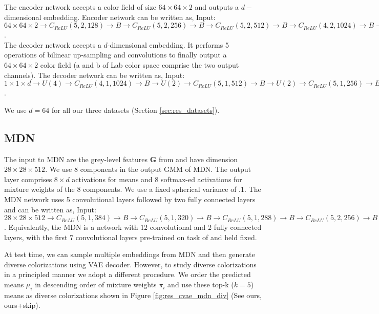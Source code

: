 \documentclass[10pt,twocolumn,letterpaper]{article}
\begin{document}
 The encoder network accepts a color field of size $64 \times 64 \times 2$
and outputs a $d-$dimensional embedding. Encoder network can be written as,  
Input: $64 \times 64 \times 2 \rightarrow C_{ReLU}(5, 2, 128) \rightarrow B \rightarrow C_{ReLU}(5, 2, 256)
\rightarrow B \rightarrow C_{ReLU}(5, 2, 512) \rightarrow B \rightarrow C_{ReLU}(4, 2, 1024) 
\rightarrow B \rightarrow F(d)$. \\

 The decoder network accepts a $d$-dimensional embedding.
It performs 5 operations of bilinear up-sampling and convolutions to finally output a 
$64 \times 64 \times 2$ color field (a and b of Lab color space comprise the two 
output channels). The decoder network can be written as, 
Input: $1 \times 1 \times d \rightarrow U(4) \rightarrow C_{ReLU}(4, 1, 1024) \rightarrow
B \rightarrow U(2) \rightarrow C_{ReLU}(5, 1, 512) \rightarrow B \rightarrow U(2) 
\rightarrow C_{ReLU}(5, 1, 256) \rightarrow B \rightarrow U(2) \rightarrow C_{ReLU}(5, 1, 128) \rightarrow B 
\rightarrow U(2) \rightarrow C_{tanh}(5, 1, 2)$.  


We use $d=64$ for all our three datasets (Section \ref{sec:res_datasets}).

\subsection{MDN}\label{sec:arch_mdn}
The input to MDN are the grey-level features $\mathbf{G}$ from \cite{ZhangColorful}
and have dimension $28 \times 28 \times 512$. We use $8$ components in the output 
GMM of MDN. The output layer comprises $8 \times d$ activations for means and $8$ 
softmax-ed activations for mixture weights of the $8$ components. We use a fixed spherical variance of 
$.1$. The MDN network
uses 5 convolutional layers followed by two fully connected layers and
can be written as, Input: $28 \times 28 \times 512 \rightarrow C_{ReLU}(5, 1, 384) \rightarrow B 
\rightarrow C_{ReLU}(5, 1, 320) \rightarrow B \rightarrow C_{ReLU}(5, 1, 288) \rightarrow B 
\rightarrow C_{ReLU}(5, 2, 256) \rightarrow B \rightarrow C_{ReLU}(5, 1, 128) \rightarrow B 
\rightarrow FC(4096) \rightarrow FC(8 \times d + 8)$. Equivalently, the MDN
is a network with $12$ convolutional and 2 fully connected layers, with the first $7$ 
convolutional layers pre-trained on task of \cite{ZhangColorful} and held fixed.

At test time, we can sample multiple embeddings from MDN and then generate diverse 
colorizations using VAE decoder. However, to study diverse colorizations in a principled 
manner we adopt a different procedure. We order the predicted means $\mu_i$ in descending 
order of mixture weights $\pi_i$ and use these top-k ($k=5$) means as diverse colorizations
shown in Figure \ref{fig:res_cvae_mdn_div} (See ours, ours+skip).
\end{document}
